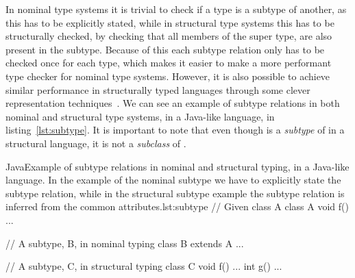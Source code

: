 In nominal type systems it is trivial to check if a type is a subtype of another, as this has to be explicitly stated, while in structural type systems this has to be structurally checked, by checking that all members of the super type, are also present in the subtype.
Because of this each subtype relation only has to be checked once for each type, which makes it easier to make a more performant type checker for nominal type systems.
However, it is also possible to achieve similar performance in structurally typed languages through some clever representation techniques~\cite{tapl}. %
We can see an example of subtype relations in both nominal and structural type systems, in a Java-like language, in listing~\vref{lst:subtype}.
It is important to note that even though  is a \emph{subtype} of  in a structural language, it is not a \emph{subclass} of .

\begin{code}{Java}{Example of subtype relations in nominal and structural typing, in a Java-like language. In the example of the nominal subtype we have to explicitly state the subtype relation, while in the structural subtype example the subtype relation is inferred from the common attributes.}{lst:subtype}
    // Given class A
    class A {
        void f() { ... }
     }

    // A subtype, B, in nominal typing
    class B extends A { ... }

    // A subtype, C, in structural typing
    class C {
        void f() { ... }
        int g() { ... }
    }
\end{code}

